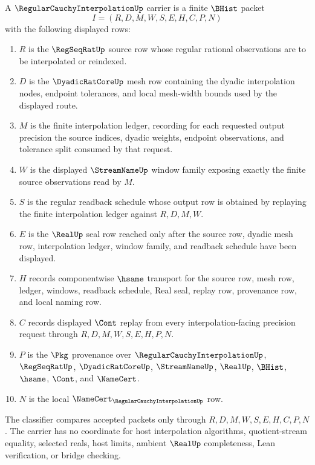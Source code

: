\begin{definition}
\label{def:regular-cauchy-interpolation-carrier}
A $\RegularCauchyInterpolationUp$ carrier is a finite $\BHist$ packet
$$
I=(R,D,M,W,S,E,H,C,P,N)
$$
with the following displayed rows:
\begin{enumerate}
\item $R$ is the $\RegSeqRatUp$ source row whose regular rational observations are to be interpolated or reindexed.
\item $D$ is the $\DyadicRatCoreUp$ mesh row containing the dyadic interpolation nodes, endpoint tolerances, and local mesh-width bounds used by the displayed route.
\item $M$ is the finite interpolation ledger, recording for each requested output precision the source indices, dyadic weights, endpoint observations, and tolerance split consumed by that request.
\item $W$ is the displayed $\StreamNameUp$ window family exposing exactly the finite source observations read by $M$.
\item $S$ is the regular readback schedule whose output row is obtained by replaying the finite interpolation ledger against $R,D,M,W$.
\item $E$ is the $\RealUp$ seal row reached only after the source row, dyadic mesh row, interpolation ledger, window family, and readback schedule have been displayed.
\item $H$ records componentwise $\hsame$ transport for the source row, mesh row, ledger, windows, readback schedule, Real seal, replay row, provenance row, and local naming row.
\item $C$ records displayed $\Cont$ replay from every interpolation-facing precision request through $R,D,M,W,S,E,H,P,N$.
\item $P$ is the $\Pkg$ provenance over $\RegularCauchyInterpolationUp$, $\RegSeqRatUp$, $\DyadicRatCoreUp$, $\StreamNameUp$, $\RealUp$, $\BHist$, $\hsame$, $\Cont$, and $\NameCert$.
\item $N$ is the local $\NameCert_{\RegularCauchyInterpolationUp}$ row.
\end{enumerate}
The classifier compares accepted packets only through $R,D,M,W,S,E,H,C,P,N$. The carrier has no coordinate for host interpolation algorithms, quotient-stream equality, selected reals, host limits, ambient $\RealUp$ completeness, Lean verification, or bridge checking.
\end{definition}

